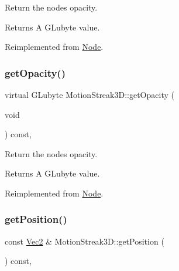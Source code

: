Return the node\textquotesingle{}s opacity. \begin{DoxyReturn}{Returns}
A G\+Lubyte value. 
\end{DoxyReturn}


Reimplemented from \hyperlink{classNode_ab999cce3763ea09e74014245c770ea97}{Node}.

\mbox{\label{classMotionStreak3D_aae52587b7c2cb5833f133b40add6a860}} 
\subsubsection{\texorpdfstring{get\+Opacity()}{getOpacity()}\hspace{0.1cm}{\footnotesize\ttfamily [2/2]}}
{\footnotesize\ttfamily virtual G\+Lubyte Motion\+Streak3\+D\+::get\+Opacity (\begin{DoxyParamCaption}\item[{void}]{ }\end{DoxyParamCaption}) const\hspace{0.3cm}{\ttfamily [override]}, {\ttfamily [virtual]}}

Return the node\textquotesingle{}s opacity. \begin{DoxyReturn}{Returns}
A G\+Lubyte value. 
\end{DoxyReturn}


Reimplemented from \hyperlink{classNode_ab999cce3763ea09e74014245c770ea97}{Node}.

\mbox{\label{classMotionStreak3D_a5c9d70a707ecdaf49d8793ae6e4bce7e}} 
\subsubsection{\texorpdfstring{get\+Position()}{getPosition()}\hspace{0.1cm}{\footnotesize\ttfamily [1/4]}}
{\footnotesize\ttfamily const \hyperlink{classVec2}{Vec2} \& Motion\+Streak3\+D\+::get\+Position (\begin{DoxyParamCaption}{ }\end{DoxyParamCaption}) const\hspace{0.3cm}{\ttfamily [override]}, {\ttfamily [virtual]}}



